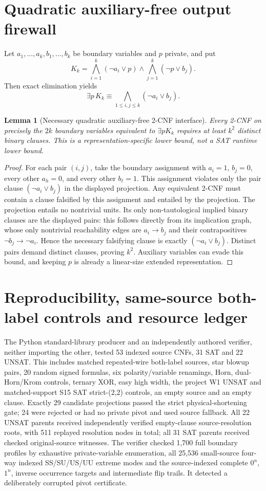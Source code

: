 \documentclass[11pt]{article}
\newtheorem{lemma}{Lemma}
\begin{document}
\section{Quadratic auxiliary-free output firewall}
Let $a_1,\ldots,a_k,b_1,\ldots,b_k$ be boundary variables and $p$ private, and put
\[
K_k=\bigwedge_{i=1}^k(\neg a_i\lor p)
\land\bigwedge_{j=1}^k(\neg p\lor b_j).
\]
Then exact elimination yields
\[
\exists p\,K_k\equiv\bigwedge_{1\le i,j\le k}(\neg a_i\lor b_j).
\]
\begin{lemma}[Necessary quadratic auxiliary-free 2-CNF interface]
Every 2-CNF on precisely the $2k$ boundary variables equivalent to $\exists p K_k$ requires at least $k^2$ distinct binary clauses. This is a representation-specific lower bound, not a SAT runtime lower bound.
\end{lemma}
\begin{proof}
For each pair $(i,j)$, take the boundary assignment with $a_i=1$, $b_j=0$, every other $a_h=0$, and every other $b_\ell=1$. This assignment violates only the pair clause $(\neg a_i\lor b_j)$ in the displayed projection. Any equivalent 2-CNF must contain a clause falsified by this assignment and entailed by the projection. The projection entails no nontrivial units. Its only non-tautological implied binary clauses are the displayed pairs: this follows directly from its implication graph, whose only nontrivial reachability edges are $a_i\to b_j$ and their contrapositives $\neg b_j\to\neg a_i$. Hence the necessary falsifying clause is exactly $(\neg a_i\lor b_j)$. Distinct pairs demand distinct clauses, proving $k^2$. Auxiliary variables can evade this bound, and keeping $p$ is already a linear-size extended representation. \qedhere
\end{proof}

\section{Reproducibility, same-source both-label controls and resource ledger}
The Python standard-library producer and an independently authored verifier, neither importing the other, tested 53 indexed source CNFs, 31 SAT and 22 UNSAT. This includes matched repeated-wire both-label sources, star blowup pairs, 20 random signed formulas, six polarity/variable renamings, Horn, dual-Horn/Krom controls, ternary XOR, easy high width, the project W1 UNSAT and matched-support S15 SAT strict-(2,2) controls, an empty source and an empty clause. Exactly 29 candidate projections passed the strict physical-shortening gate; 24 were rejected or had no private pivot and used source fallback. All 22 UNSAT parents received independently verified empty-clause source-resolution roots, with 511 replayed resolution nodes in total; all 31 SAT parents received checked original-source witnesses. The verifier checked 1,700 full boundary profiles by exhaustive private-variable enumeration, all 25,536 small-source four-way indexed SS/SU/US/UU extreme modes and the source-indexed complete $0^n$, $1^n$, inverse occurrence targets and intermediate flip trails. It detected a deliberately corrupted pivot certificate.
\end{document}
